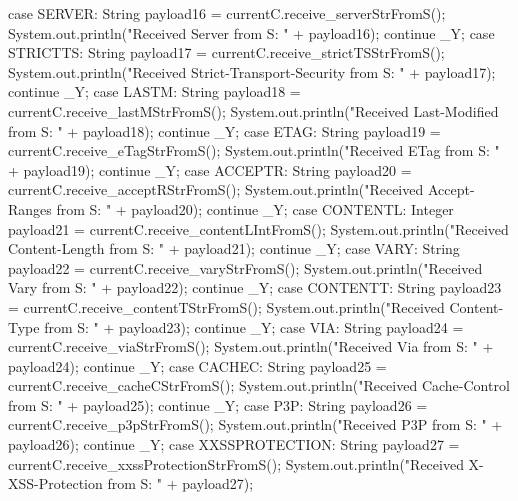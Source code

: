 \begin{code}
{{{{                case SERVER:
                    String payload16 = currentC.receive_serverStrFromS();
                    System.out.println("Received Server from S: " + payload16);
                    continue _Y;
                case STRICTTS:
                    String payload17 = currentC.receive_strictTSStrFromS();
                    System.out.println("Received Strict-Transport-Security from S: " + payload17);
                    continue _Y;
                case LASTM:
                    String payload18 = currentC.receive_lastMStrFromS();
                    System.out.println("Received Last-Modified from S: " + payload18);
                    continue _Y;
                case ETAG:
                    String payload19 = currentC.receive_eTagStrFromS();
                    System.out.println("Received ETag from S: " + payload19);
                    continue _Y;
                case ACCEPTR:
                    String payload20 = currentC.receive_acceptRStrFromS();
                    System.out.println("Received Accept-Ranges from S: " + payload20);
                    continue _Y;
                case CONTENTL:
                    Integer payload21 = currentC.receive_contentLIntFromS();
                    System.out.println("Received Content-Length from S: " + payload21);
                    continue _Y;
                case VARY:
                    String payload22 = currentC.receive_varyStrFromS();
                    System.out.println("Received Vary from S: " + payload22);
                    continue _Y;
                case CONTENTT:
                    String payload23 = currentC.receive_contentTStrFromS();
                    System.out.println("Received Content-Type from S: " + payload23);
                    continue _Y;
                case VIA:
                    String payload24 = currentC.receive_viaStrFromS();
                    System.out.println("Received Via from S: " + payload24);
                    continue _Y;
                case CACHEC:
                    String payload25 = currentC.receive_cacheCStrFromS();
                    System.out.println("Received Cache-Control from S: " + payload25);
                    continue _Y;
                case P3P:
                    String payload26 = currentC.receive_p3pStrFromS();
                    System.out.println("Received P3P from S: " + payload26);
                    continue _Y;
                case XXSSPROTECTION:
                    String payload27 = currentC.receive_xxssProtectionStrFromS();
                    System.out.println("Received X-XSS-Protection from S: " + payload27);
}}}}
\end{code}
